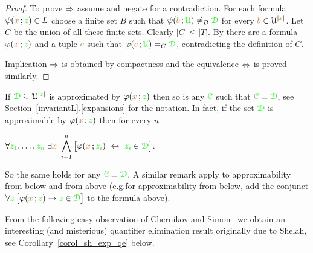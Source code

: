 \documentclass[creche.tex]{subfiles}
\begin{document}
\begin{proof}
To prove $\Rightarrow$ assume  and negate  for a contradiction.
For each formula $\psi({\color{brown} x}\,;{\color{green} z})\in L$ choose a finite set $B$ such that $\psi({\color{brown} b}\,;{\color{green}\EuScript U})\neq_B{\color{green}\EuScript D}$ for every ${\color{brown} b}\in\EuScript U^{|{\color{brown} x}|}$.
Let $C$ be the union of all these finite sets.
Clearly $|C|\le|T|$.
By  there are a formula $\varphi({\color{brown} x}\,;{\color{green} z})$ and a tuple ${\color{brown} c}$ such that $\varphi({\color{brown} c}\,;{\color{green}\EuScript U})=_C{\color{green}\EuScript D}$, contradicting the definition of $C$.

Implication $\Rightarrow$ is obtained by compactness and the equivalence $\Leftrightarrow$ is proved similarly.
\end{proof}



\begin{remark}\label{prop_approx_el_eq}
If ${\color{green}\EuScript D}\subseteq\EuScript U^{|{\color{green} z}|}$ is approximated by $\varphi({\color{brown} x}\,;{\color{green} z})$ then so is any ${\color{green}\EuScript C}$ such that ${\color{green}\EuScript C}\equiv{\color{green}\EuScript D}$, see Section~\hyperref[expansions]{\ref*{invariantL}.\ref*{expansions}} for the notation.
In fact, if the set ${\color{green}\EuScript D}$ is approximable by $\varphi({\color{brown} x}\,;{\color{green} z})$ then for every $n$

\hfil$\displaystyle\A {\gr z_1},\dots,{\gr z_n}\;\E {\mr x}\ \bigwedge^n_{i=1}\big[\phi({\mr x}\,;{\gr z_i})\ \iff\ {\gr z_i}\in{\gr \D}\big]$.


So the same holds for any ${\color{green}\EuScript C}\equiv{\color{green}\EuScript D}$.
A similar remark apply to approximability from below and from above (e.g.\@ for approximability from below, add the conjunct $\forall {\color{green}z}\,\big[\varphi({\color{brown} x}\,;{\color{green} z})\rightarrow {\color{green}z}\in{\color{green}\EuScript D}\big]$ to the formula above).\QED
\end{remark}

From the following easy observation of Chernikov and Simon~\cite{CS} we obtain an interesting (and misterious) quantifier elimination result originally due to Shelah, see Corollary~\ref{corol_sh_exp_qe} below.
\end{document}
